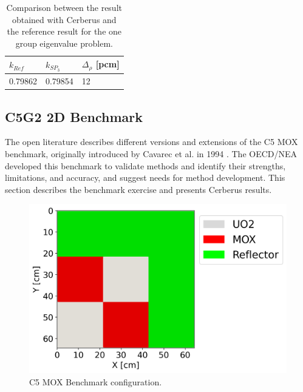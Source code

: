 \documentclass{anstrans}
\begin{document}

\begin{table}[htbp!]
	\centering
	\caption{Comparison between the result obtained with Cerberus and the reference result for the one group eigenvalue problem.}
	\label{tab:keff-1st}
	\begin{tabular}{lll}
	\toprule
		$k_{Ref}$	& $k_{SP_3}$ 	& $\Delta_{\rho}$ [pcm]	\\
	\midrule
	 	0.79862		& 0.79854		& 12				\\
	\bottomrule
	\end{tabular}
\end{table}


\subsection{C5G2 2D Benchmark}

The open literature describes different versions and extensions of the C5 MOX benchmark, originally introduced by Cavarec et al. in 1994 \cite{cavarec_benchmark_1994}.
The \gls{OECD}/\gls{NEA} developed this benchmark to validate methods and identify their strengths, limitations, and accuracy, and suggest needs for method development.
This section describes the benchmark exercise and presents Cerberus results.

\begin{figure}[H] %
    \centering
    \includegraphics[width=0.7\linewidth]{figures/geo-xy2.png}
    \hfill
    \caption{C5 MOX Benchmark configuration.}
    \label{fig:bench1}
\end{figure}
\end{document}
